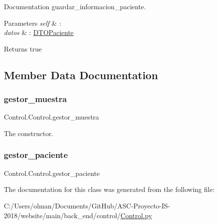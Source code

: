 Documentation guardar\+\_\+informacion\+\_\+paciente. 


\begin{DoxyParams}{Parameters}
{\em self} & \+: \\
\hline
{\em datos} & \+: \mbox{\hyperlink{namespace_d_t_o_paciente}{D\+T\+O\+Paciente}} \\
\hline
\end{DoxyParams}
\begin{DoxyReturn}{Returns}
true 
\end{DoxyReturn}


\subsection{Member Data Documentation}
\mbox{\label{class_control_1_1_control_a3f36ff12e9a8426c59576f5273feb27f}} 
\subsubsection{\texorpdfstring{gestor\+\_\+muestra}{gestor\_muestra}}
{\footnotesize\ttfamily Control.\+Control.\+gestor\+\_\+muestra}



The constructor. 

\mbox{\label{class_control_1_1_control_a0ba7f844d0615b75a51687f61ca0e082}} 
\subsubsection{\texorpdfstring{gestor\+\_\+paciente}{gestor\_paciente}}
{\footnotesize\ttfamily Control.\+Control.\+gestor\+\_\+paciente}



The documentation for this class was generated from the following file\+:\begin{DoxyCompactItemize}
\item 
C\+:/\+Users/olman/\+Documents/\+Git\+Hub/\+A\+S\+C-\/\+Proyecto-\/\+I\+S-\/2018/website/main/back\+\_\+end/control/\mbox{\hyperlink{_control_8py}{Control.\+py}}\end{DoxyCompactItemize}

